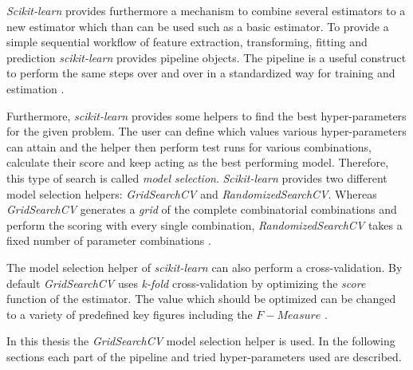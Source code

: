 \emph{Scikit-learn} provides furthermore a mechanism to combine several estimators to a new estimator which than can be used such as a basic estimator.
To provide a simple sequential workflow of feature extraction, transforming, fitting and prediction \emph{scikit-learn} provides pipeline objects.
The pipeline is a useful construct to perform the same steps over and over in a standardized way for training and estimation
\citep{buitinck2013api}.

Furthermore, \emph{scikit-learn} provides some helpers to find the best hyper-parameters for the given problem.
The user can define which values various hyper-parameters can attain and the helper then perform test runs for various combinations, calculate their score and keep acting as the best performing model.
Therefore, this type of search is called \emph{model selection}.
\emph{Scikit-learn} provides two different model selection helpers: \emph{GridSearchCV} and \emph{RandomizedSearchCV}.
Whereas \emph{GridSearchCV} generates a \emph{grid} of the complete combinatorial combinations and perform the scoring with every single combination, \emph{RandomizedSearchCV} takes a fixed number of parameter combinations
\citep{buitinck2013api}.

The model selection helper of \emph{scikit-learn} can also perform a cross-validation.
By default \emph{GridSearchCV} uses \emph{k-fold} cross-validation by optimizing the \emph{score} function of the estimator.
The value which should be optimized can be changed to a variety of predefined key figures including the $F-Measure$
\citep{buitinck2013api}.

In this thesis the \emph{GridSearchCV} model selection helper is used. 
In the following sections each part of the pipeline and tried hyper-parameters used are described.

